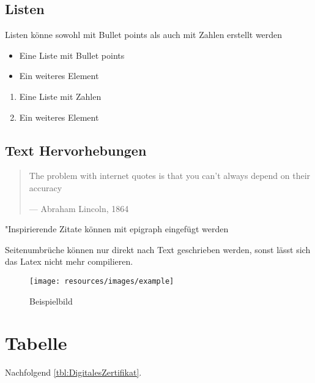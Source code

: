 \subsection{Listen}
Listen könne sowohl mit Bullet points als auch mit Zahlen erstellt werden
\begin{itemize}
	\item Eine Liste mit Bullet points
	\item Ein weiteres Element
\end{itemize}

\begin{enumerate}
	\item Eine Liste mit Zahlen
	\item Ein weiteres Element
\end{enumerate}

\subsection{Text Hervorhebungen}
\begin{quote}
	The problem with internet quotes is that you can't always depend on their accuracy \par\raggedleft--- \textup{Abraham Lincoln, 1864}
\end{quote}

"Inspirierende Zitate können mit epigraph eingefügt werden

Seitenumbrüche können nur direkt nach Text geschrieben werden, sonst lässt sich das Latex nicht mehr compilieren.
\\

\begin{figure}[H]
	\centering
	\texttt{[image: resources/images/example]}
	\caption{Beispielbild {\cite{PEXELS2015}}}
	\label{img:beispielbild}
\end{figure}

\section{Tabelle}

Nachfolgend \autoref{tbl:DigitalesZertifikat}.

